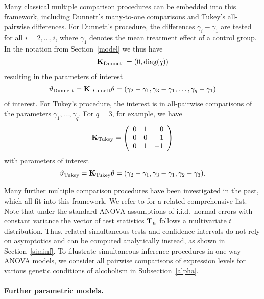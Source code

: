 \documentclass[12pt,a4paper]{article}
\begin{document}
Many classical multiple comparison procedures can be embedded into this
framework, including Dunnett's many-to-one comparisons and Tukey's
all-pairwise differences. For Dunnett's procedure, the differences $%
\gamma_i - \gamma_1$ are tested for all $i=2, \ldots, i$, where $\gamma_1$
denotes the mean treatment effect of a control group. In the notation from
Section~\ref{model} we thus have 
\begin{eqnarray*}
\mathbf{K}_\text{Dunnett} = (0, \text{diag}(q))
\end{eqnarray*}
resulting in the parameters of interest
\begin{eqnarray*}
\vartheta_\text{Dunnett} = \mathbf{K}_\text{Dunnett} \theta = (\gamma_2 - \gamma_1, \gamma_3 - \gamma_1,
\dots, \gamma_q - \gamma_1)
\end{eqnarray*}
of interest. For Tukey's procedure, the interest is in all-pairwise
comparisons of the parameters $\gamma_1, \dots, \gamma_q$. For $q = 3$, for
example, we have 
\begin{eqnarray*}
\K_\text{Tukey} = \left( 
\begin{array}{rrr}
0 & 1 & 0 \\ 
0 & 0 & 1 \\ 
0 & 1 & -1%
\end{array}
\right)
\end{eqnarray*}
with parameters of interest
\begin{eqnarray*}
\vartheta_\text{Tukey} = \mathbf{K}_\text{Tukey} \theta = (\gamma_2 - \gamma_1, \gamma_3 - \gamma_1,
\gamma_2 - \gamma_3).
\end{eqnarray*}

Many further multiple comparison procedures have been investigated in the
past, which all fit into this framework. We refer to
\cite{BretzGenzHothorn2001} for
a related comprehensive list. Note that under the standard ANOVA assumptions
of i.i.d.~normal errors with constant variance the vector of test statistics 
$\mathbf{T}_n$ follows a multivariate $t$ distribution. Thus, related simultaneous
tests and confidence intervals do not rely on asymptotics and can be
computed analytically instead, as shown in Section~\ref{siminf}.
To illustrate simultaneous inference procedures in one-way ANOVA models, we
consider all pairwise comparisons of expression levels for various genetic
conditions of alcoholism in Subsection~\ref{alpha}.

\paragraph{Further parametric models.}
\end{document}
